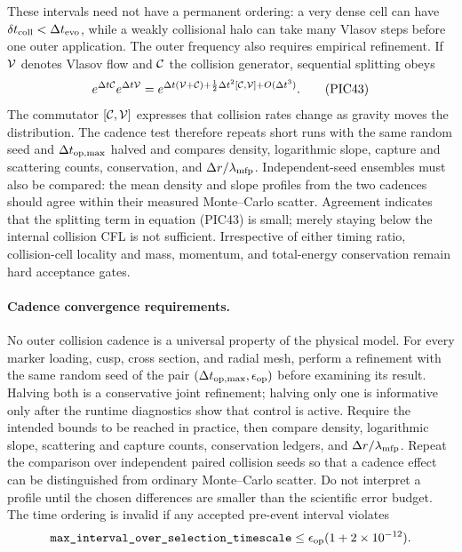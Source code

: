These intervals need not have a permanent ordering: a very dense cell can
have \(\delta t_{\rm coll}<\Delta t_{\rm evo}\), while a weakly collisional
halo can take many Vlasov steps before one outer application.  The outer
frequency also requires empirical refinement.  If \({\cal V}\) denotes Vlasov
flow and \({\cal C}\) the collision generator, sequential splitting obeys
\[
 e^{\Delta t{\cal C}}e^{\Delta t{\cal V}}
 =e^{\Delta t({\cal V}+{\cal C})
   +\frac12\Delta t^2[{\cal C},{\cal V}]
   +O(\Delta t^3)} .                                   \tag{PIC43}
\]
The commutator \([{\cal C},{\cal V}]\) expresses that collision rates change
as gravity moves the distribution.  The cadence test therefore repeats short runs with the same random seed and \(\Delta t_{\rm op,max}\) halved and compares density,
logarithmic slope, capture and scattering counts, conservation, and
\(\Delta r/\lambda_{\rm mfp}\).  Independent-seed ensembles must also be
compared: the mean density and slope profiles from the two cadences should
agree within their measured Monte--Carlo scatter.  Agreement indicates that
the splitting term in equation (PIC43) is small; merely staying below the
internal collision CFL is not sufficient.  Irrespective of either timing
ratio, collision-cell locality and mass, momentum, and total-energy
conservation remain hard acceptance gates.

\paragraph{Cadence convergence requirements.}
No outer collision cadence is a universal property of the physical model.
For every marker loading, cusp, cross section, and radial mesh, perform a
refinement with the same random seed of the pair
\((\Delta t_{\rm op,max},\epsilon_{\rm op})\) before examining its result.
Halving both is a conservative joint refinement; halving only one is
informative only after the runtime diagnostics show that control is active.
Require the intended bounds to be reached in practice, then compare density,
logarithmic slope,
scattering and capture counts, conservation ledgers, and
\(\Delta r/\lambda_{\rm mfp}\).  Repeat the comparison over independent paired
collision seeds so that a cadence effect can be distinguished from ordinary
Monte--Carlo scatter.  Do not interpret a profile until the chosen differences
are smaller than the scientific error budget.  The time ordering is invalid
if any accepted pre-event interval violates
\[
  \code{max_interval_over_selection_timescale}
  \leq \epsilon_{\rm op}(1+2\times10^{-12}).
\]

